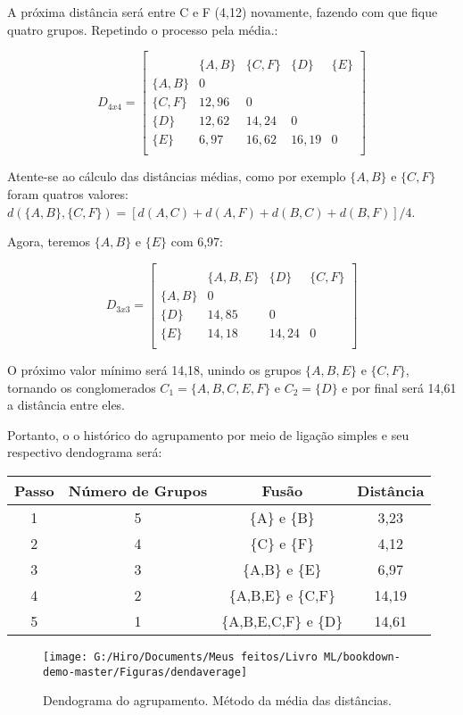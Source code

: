 \documentclass[
]{book}
\begin{document}
A próxima distância será entre C e F (4,12) novamente, fazendo com que fique quatro grupos. Repetindo o processo pela média.:

\[D_{4x4}=\begin{bmatrix}\\
 &\{A,B\}& \{C,F\}&\{D\}&\{E\} \\
 \{A,B\}&0&&\\
 \{C,F\} & 12,96&0&&\\
 \{D\}& 12,62& 14,24&0&\\
 \{E\}& 6,97& 16,62& 16,19&0\\
\end{bmatrix}\]

Atente-se ao cálculo das distâncias médias, como por exemplo \(\{A,B\}\) e \(\{C,F\}\) foram quatros valores: \(d(\{A,B\},\{C,F\})=[d(A,C)+d(A,F)+d(B,C)+d(B,F)]/4\).

Agora, teremos \(\{A,B\}\) e \(\{E\}\) com 6,97:

\[D_{3x3}=\begin{bmatrix}\\
 &\{A,B,E\}& \{D\}&\{C,F\} \\
 \{A,B\}&0&\\
 \{D\} & 14,85&0&\\
 \{E\}& 14,18& 14,24&0\\
\end{bmatrix}\]

O próximo valor mínimo será 14,18, unindo os grupos \(\{A,B,E\}\) e \(\{C,F\}\), tornando os conglomerados \(C_1=\{A,B,C,E,F\}\) e \(C_2=\{D\}\) e por final será 14,61 a distância entre eles.

Portanto, o o histórico do agrupamento por meio de ligação simples e seu respectivo dendograma será:

\begin{longtable}[]{@{}cccc@{}}
\toprule
\textbf{Passo} & \textbf{Número de Grupos} & \textbf{Fusão} & \textbf{Distância}\tabularnewline
\midrule
\endhead
1 & 5 & \{A\} e \{B\} & 3,23\tabularnewline
2 & 4 & \{C\} e \{F\} & 4,12\tabularnewline
3 & 3 & \{A,B\} e \{E\} & 6,97\tabularnewline
4 & 2 & \{A,B,E\} e \{C,F\} & 14,19\tabularnewline
5 & 1 & \{A,B,E,C,F\} e \{D\} & 14,61\tabularnewline
\bottomrule
\end{longtable}

\begin{figure}

{\centering \texttt{[image: G:/Hiro/Documents/Meus feitos/Livro ML/bookdown-demo-master/Figuras/dendaverage]} 

}

\caption{Dendograma do agrupamento. Método da média das distâncias.}\label{fig:dendaverage}
\end{figure}
\end{document}
